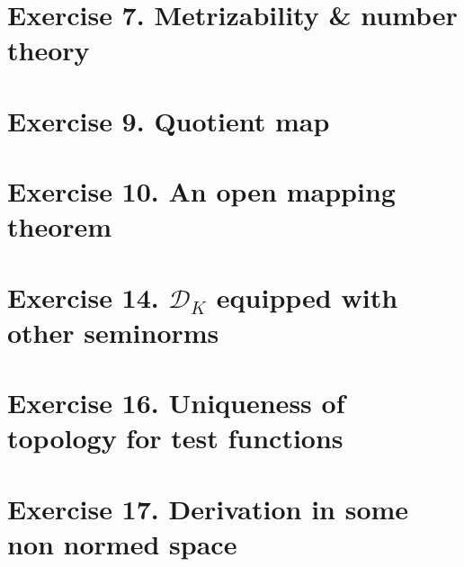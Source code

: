 %
%
\newpage
\section{Exercise 7. Metrizability \& number theory}

\newpage
\section{Exercise 9. Quotient map}

\newpage
\section{Exercise 10. An open mapping theorem}

\newpage
\section{Exercise 14. $\mathscr{D}_K$ equipped with other seminorms}

\newpage
\section{Exercise 16. Uniqueness of topology for test functions}

\newpage
\section{Exercise 17. Derivation in some non normed space}
